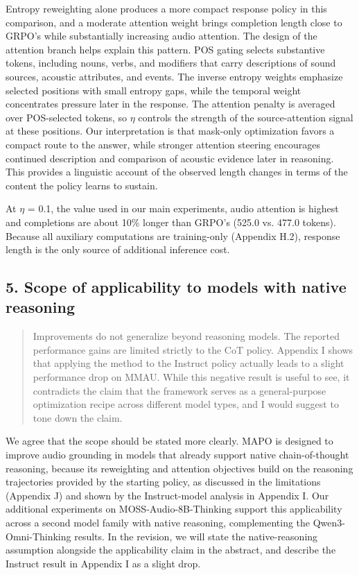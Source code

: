 Entropy reweighting alone produces a more compact response policy in this comparison, and a moderate attention weight brings completion length close to GRPO's while substantially increasing audio attention. The design of the attention branch helps explain this pattern. POS gating selects substantive tokens, including nouns, verbs, and modifiers that carry descriptions of sound sources, acoustic attributes, and events. The inverse entropy weights emphasize selected positions with small entropy gaps, while the temporal weight concentrates pressure later in the response. The attention penalty is averaged over POS-selected tokens, so \ensuremath{\eta} controls the strength of the source-attention signal at these positions. Our interpretation is that mask-only optimization favors a compact route to the answer, while stronger attention steering encourages continued description and comparison of acoustic evidence later in reasoning. This provides a linguistic account of the observed length changes in terms of the content the policy learns to sustain.

At \ensuremath{\eta} = 0.1, the value used in our main experiments, audio attention is highest and completions are about 10\% longer than GRPO's (525.0 vs. 477.0 tokens). Because all auxiliary computations are training-only (Appendix H.2), response length is the only source of additional inference cost.

\subsection*{5. Scope of applicability to models with native reasoning}

\begin{quote}\small\color{ReviewQuote}
Improvements do not generalize beyond reasoning models. The reported performance gains are limited strictly to the CoT policy. Appendix I shows that applying the method to the Instruct policy actually leads to a slight performance drop on MMAU. While this negative result is useful to see, it contradicts the claim that the framework serves as a general-purpose optimization recipe across different model types, and I would suggest to tone down the claim.

\end{quote}

We agree that the scope should be stated more clearly. MAPO is designed to improve audio grounding in models that already support native chain-of-thought reasoning, because its reweighting and attention objectives build on the reasoning trajectories provided by the starting policy, as discussed in the limitations (Appendix J) and shown by the Instruct-model analysis in Appendix I. Our additional experiments on MOSS-Audio-8B-Thinking support this applicability across a second model family with native reasoning, complementing the Qwen3-Omni-Thinking results. In the revision, we will state the native-reasoning assumption alongside the applicability claim in the abstract, and describe the Instruct result in Appendix I as a slight drop.
